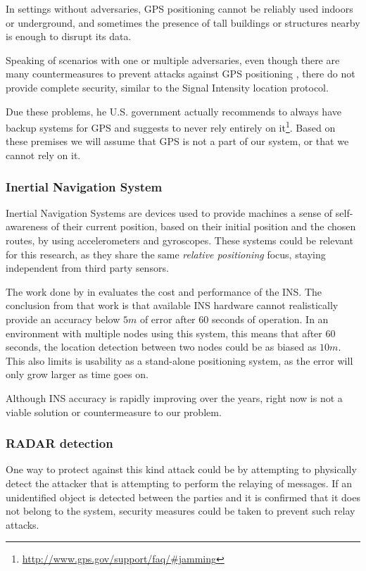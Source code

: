 \documentclass{article}
\begin{document}
In settings without adversaries, GPS positioning cannot be reliably used indoors or underground, and sometimes the presence of tall buildings or structures nearby is enough to disrupt its data.

Speaking of scenarios with one or multiple adversaries, even though there are many countermeasures to prevent attacks against GPS positioning \cite{warner2003gps, wen2005countermeasures, jafarnia2012gps}, there do not provide complete security, similar to the Signal Intensity location protocol.

Due these problems, he U.S. government actually recommends to always have backup systems for GPS and suggests to never rely entirely on it\footnote{\url{http://www.gps.gov/support/faq/#jamming}}. Based on these premises we will assume that GPS is not a part of our system, or that we cannot rely on it.

\subsubsection{Inertial Navigation System}

Inertial Navigation Systems are devices used to provide machines a sense of self-awareness of their current position, based on their initial position and the chosen routes, by using accelerometers and gyroscopes. These systems could be relevant for this research, as they share the same \emph{relative positioning} focus, staying independent from third party sensors.

The work done by \citeauthor{woodman2007introduction} in \cite{woodman2007introduction} evaluates the cost and performance of the INS. The conclusion from that work is that available INS hardware cannot realistically provide an accuracy below $5m$ of error after $60$ seconds of operation. In an environment with multiple nodes using this system, this means that after $60$ seconds, the location detection between two nodes could be as biased as $10m$. This also limits is usability as a stand-alone positioning system, as the error will only grow larger as time goes on.

Although INS accuracy is rapidly improving over the years, right now is not a viable solution or countermeasure to our problem.

\subsubsection{RADAR detection}

One way to protect against this kind attack could be by attempting to physically detect the attacker that is attempting to perform the relaying of messages. If an unidentified object is detected between the parties and it is confirmed that it does not belong to the system, security measures could be taken to prevent such relay attacks.
\end{document}
